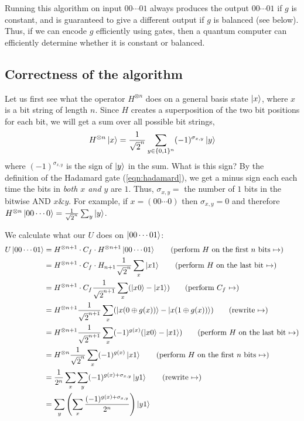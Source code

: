 Running this algorithm on input $00\cdots01$ always produces the output $00\cdots01$ if $g$ is constant,
and is guaranteed to give a different output if $g$ is balanced (see below).
Thus, if we can encode $g$ efficiently using gates, then a quantum computer can efficiently determine whether it is constant or balanced.

\subsection{Correctness of the algorithm}

Let us first see what the operator $H^{\otimes n}$ does on a general basis state $\ket{x}$, where $x$ is a bit string of length $n$.
Since $H$ creates a superposition of the two bit positions for each bit, we will get a sum over all possible bit strings,
\begin{align*}
  H^{\otimes n} \ket{x} = \frac{1}{\sqrt{2}^n} \sum_{y \in \{0,1\}^n} (-1)^{\sigma_{x,y}} \ket{y}
\end{align*}
where $(-1)^{\sigma_{x,y}}$ is the sign of $\ket{y}$ in the sum.
What is this sign?
By the definition of the Hadamard gate (\ref{eqn:hadamard}), we get a minus sign each each time the bits in \emph{both $x$ and $y$} are $1$.
Thus, $\sigma_{x,y} =$ the number of $1$ bits in the bitwise AND $x \& y$.
For example, if $x = (00\cdots0)$ then $\sigma_{x,y} = 0$ and therefore $H^{\otimes n} \ket{00\cdots0} = \frac{1}{\sqrt{2}^n} \sum_y \ket{y}$.

\newcommand{\nexttag}[1]{\tag{#1 $\mapsto$}}

We calculate what our $U$ does on $\ket{00\cdots01}$:
\begin{align*}
  U\ket{00\cdots01} &= H^{\otimes n+1} \cdot C_f \cdot H^{\otimes n+1} \ket{00\cdots01} \nexttag{perform $H$ on the first $n$ bits}\\
  &= H^{\otimes n+1} \cdot C_f \cdot H_{n+1} \frac{1}{\sqrt{2}^n} \sum_x \ket{x1} \nexttag{perform $H$ on the last bit}\\
  &= H^{\otimes n+1} \cdot C_f \frac{1}{\sqrt{2}^{n+1}} \sum_x (\ket{x0} - \ket{x1}) \nexttag{perform $C_f$}\\
  &= H^{\otimes n+1} \frac{1}{\sqrt{2}^{n+1}} \sum_x (\ket{x(0 \oplus g(x))} - \ket{x(1 \oplus g(x))}) \nexttag{rewrite}\\
  &= H^{\otimes n+1} \frac{1}{\sqrt{2}^{n+1}} \sum_x (-1)^{g(x)}(\ket{x0} - \ket{x1}) \nexttag{perform $H$ on the last bit}\\
  &= H^{\otimes n} \frac{1}{\sqrt{2}^{n}} \sum_x (-1)^{g(x)}\ket{x1} \nexttag{perform $H$ on the first $n$ bits}\\
  &= \frac{1}{2^n} \sum_x \sum_y (-1)^{g(x)+\sigma_{x,y}}\ket{y1} \nexttag{rewrite}\\
  &= \sum_y \left(\sum_x \frac{(-1)^{g(x)+\sigma_{x,y}}}{2^n}\right)\ket{y1}
\end{align*}

